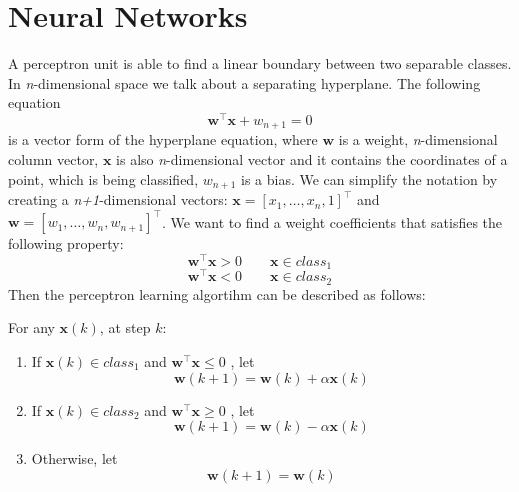 \chapter{Neural Networks}



A perceptron unit is able to find a linear boundary between two separable classes. In \emph{n}-dimensional space we talk about a separating hyperplane. The following equation \begin{equation} \bm{w}^\top \bm{x}+ w_{n+1} = 0\end{equation} is a vector form of the hyperplane equation, where $\bm{w}$ is a weight, \emph{n}-dimensional column vector, $\bm{x}$ is also \emph{n}-dimensional vector and it contains the coordinates of a point, which is being classified, $w_{n+1}$ is a bias. We can simplify the notation by creating a \emph{n+1}-dimensional vectors: $\bm{x} = [x_1, \dots, x_n, 1]^\top$ and $\bm{w} = [w_1, \dots, w_n, w_{n+1}]^\top$.
We want to find a weight coefficients that satisfies the following property:
\begin{equation}
\bm{w}^\top \bm{x} > 0 \qquad \bm{x} \in {class_1}\end{equation}
\begin{equation}
\bm{w}^\top \bm{x} < 0 \qquad \bm{x} \in {class_2}
\end{equation}
Then the perceptron learning algortihm can be described as follows:

For any $\bm{x}(k)$, at step $k$:
\begin{enumerate}
    \item If $\bm{x}( k ) \in class_1$ and $\bm{w}^\top \bm{x} \leq 0$ , let    
    \begin{equation}\bm{w} ( k + 1 ) = \bm{w} ( k ) + \alpha  \bm{x }( k )\end{equation}
    \item If $\bm{x}( k ) \in class_2$ and $\bm{w}^\top \bm{x} \geq 0$ , let   
    \begin{equation}\bm{w} ( k + 1 ) = \bm{w} ( k ) - \alpha  \bm{x }( k )\end{equation}
    \item Otherwise, let 
    \begin{equation}\bm{w} ( k + 1 ) = \bm{w} ( k )\end{equation}
\end{enumerate}

